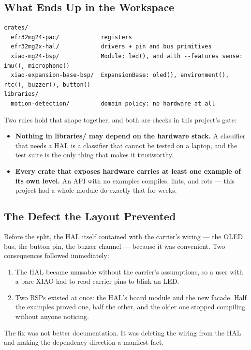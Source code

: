 \subsection{What Ends Up in the Workspace}

\begin{verbatim}
crates/
  efr32mg24-pac/            registers
  efr32mg2x-hal/            drivers + pin and bus primitives
  xiao-mg24-bsp/            Module: led(), and with --features sense: imu(), microphone()
  xiao-expansion-base-bsp/  ExpansionBase: oled(), environment(), rtc(), buzzer(), button()
libraries/
  motion-detection/         domain policy: no hardware at all
\end{verbatim}

Two rules hold that shape together, and both are checks in this project's gate:

\begin{itemize}
    \item \textbf{Nothing in libraries/ may depend on the hardware stack.} A classifier
          that needs a HAL is a classifier that cannot be tested on a laptop, and the test suite is the
          only thing that makes it trustworthy.
    \item \textbf{Every crate that exposes hardware carries at least one example of its own level.} An
          API with no examples compiles, lints, and rots — this project had a whole module do exactly
          that for weeks.
\end{itemize}

\subsection{The Defect the Layout Prevented}

Before the split, the HAL itself contained  with the carrier's wiring — the OLED
bus, the button pin, the buzzer channel — because it was convenient. Two consequences followed
immediately:

\begin{enumerate}
    \item The HAL became unusable without the carrier's assumptions, so a user with a bare XIAO had to
          read carrier pins to blink an LED.
    \item Two BSPs existed at once: the HAL's board module and the new facade. Half the examples proved
          one, half the other, and the older one stopped compiling without anyone noticing.
\end{enumerate}

The fix was not better documentation. It was deleting the wiring from the HAL and making the
dependency direction a manifest fact.
